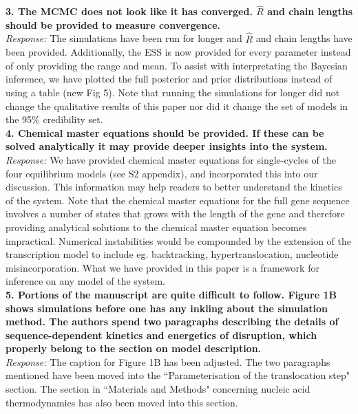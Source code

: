 \documentclass[12pt]{article}
\begin{document}
\noindent \textbf{3.  The MCMC does not look like it has converged. $\hat{R}$ and chain lengths should be provided to measure convergence.} \\
\textit{Response:} The simulations have been run for longer and $\hat{R}$ and chain lengths have been provided. Additionally, the ESS is now provided for every parameter instead of only providing the range and mean. To assist with interpretating the Bayesian inference, we have plotted the full posterior and prior distributions instead of using a table (new Fig 5). Note that running the simulations for longer did not change the qualitative results of this paper nor did it change the set of models in the 95\% credibility set.  \\

\noindent \textbf{4. Chemical master equations should be provided. If these can be solved analytically it may provide deeper insights into the system.} \\
\textit{Response:} We have provided chemical master equations for single-cycles of the four equilibrium models (see S2 appendix), and incorporated this into our discussion. This information may help readers to better understand the kinetics of the system. Note that the chemical master equations for the full gene sequence involves a number of states that grows with the length of the gene and therefore providing  analytical solutions to the chemical master equation becomes impractical. Numerical instabilities would be compounded by the extension of the transcription model to include eg. backtracking, hypertranslocation, nucleotide misincorporation. What we have provided in this paper is a framework for inference on any model of the system.  \\



\noindent \textbf{5. Portions of the manuscript are quite difficult to follow. Figure 1B shows simulations before one has any inkling about the simulation method. The authors spend two paragraphs describing the details of sequence-dependent kinetics and energetics of disruption, which properly belong to the section on model description.} \\
\textit{Response:} The caption for Figure 1B has been adjusted. The two paragraphs mentioned have been moved into the ``Parameterisation of the translocation step" section. The section in ``Materials and Methods" concerning nucleic acid thermodynamics has also been moved into this section.   \\
\end{document}
